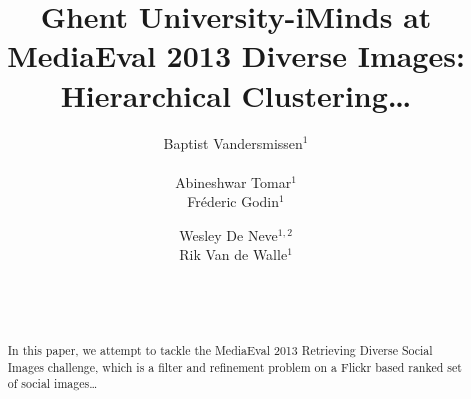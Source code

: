\documentclass{acm_proc_article-me11_tweaked}
\begin{document}

\title{Ghent University-iMinds at MediaEval 2013 Diverse Images: Hierarchical Clustering\ldots}

\author{
\alignauthor
Baptist Vandersmissen$^1$\\
\\    
\alignauthor
Abineshwar Tomar$^1$ \\
\alignauthor
Fr\'ederic Godin$^1$\\
\and  %
\alignauthor
Wesley De Neve$^{1,2}$\\
\alignauthor
Rik Van de Walle$^1$\\
\and
\\
\\ 
}
\maketitle
\begin{abstract}
In this paper, we attempt to tackle the MediaEval 2013 Retrieving Diverse Social Images challenge, which is a filter and refinement problem on a Flickr based ranked set of social images\ldots
\end{abstract}
% 
% 
\end{document}
